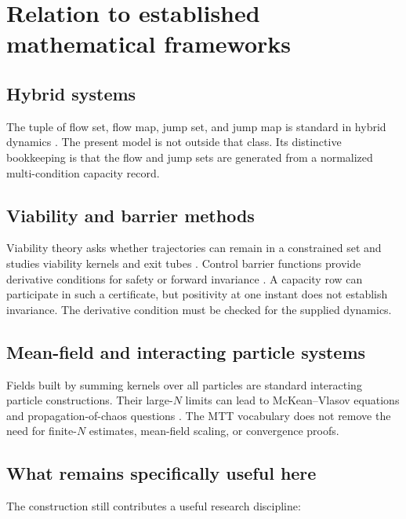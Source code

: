 \documentclass[11pt]{article}
\theoremstyle{definition}
\theoremstyle{remark}
\begin{document}
\section{Relation to established mathematical frameworks}
\label{sec:literature}

\subsection{Hybrid systems}

The tuple of flow set, flow map, jump set, and jump map is standard in
hybrid dynamics \cite{GoebelSanfeliceTeel2009,GoebelSanfeliceTeel2012}.
The present model is not outside that class.  Its distinctive bookkeeping
is that the flow and jump sets are generated from a normalized
multi-condition capacity record.

\subsection{Viability and barrier methods}

Viability theory asks whether trajectories can remain in a constrained set
and studies viability kernels and exit tubes \cite{Aubin2009}.  Control
barrier functions provide derivative conditions for safety or forward
invariance \cite{AmesEtAl2017}.  A capacity row can participate in such a
certificate, but positivity at one instant does not establish invariance.
The derivative condition must be checked for the supplied dynamics.

\subsection{Mean-field and interacting particle systems}

Fields built by summing kernels over all particles are standard interacting
particle constructions.  Their large-$N$ limits can lead to
McKean--Vlasov equations and propagation-of-chaos questions
\cite{ChaintronDiez2022}.  The MTT vocabulary does not remove the need for
finite-$N$ estimates, mean-field scaling, or convergence proofs.

\subsection{What remains specifically useful here}

The construction still contributes a useful research discipline:
\end{document}
